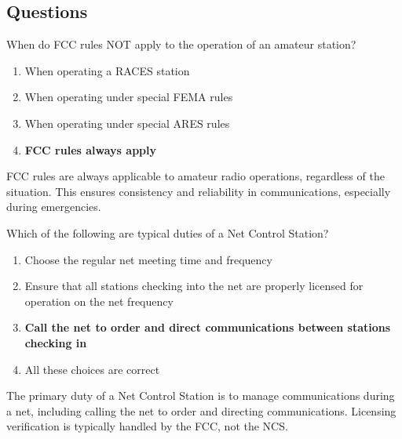 \subsection*{Questions}
\begin{tcolorbox}[colback=gray!10!white,colframe=black!75!black,title={T2C01}]
    When do FCC rules NOT apply to the operation of an amateur station?
    \begin{enumerate}[label=\Alph*),noitemsep]
        \item When operating a RACES station
        \item When operating under special FEMA rules
        \item When operating under special ARES rules
        \item \textbf{FCC rules always apply}
    \end{enumerate}
\end{tcolorbox}
FCC rules are always applicable to amateur radio operations, regardless of the situation. This ensures consistency and reliability in communications, especially during emergencies.


\begin{tcolorbox}[colback=gray!10!white,colframe=black!75!black,title={T2C02}]
    Which of the following are typical duties of a Net Control Station?
    \begin{enumerate}[label=\Alph*),noitemsep]
        \item Choose the regular net meeting time and frequency
        \item Ensure that all stations checking into the net are properly licensed for operation on the net frequency
        \item \textbf{Call the net to order and direct communications between stations checking in}
        \item All these choices are correct
    \end{enumerate}
\end{tcolorbox}
The primary duty of a Net Control Station is to manage communications during a net, including calling the net to order and directing communications. Licensing verification is typically handled by the FCC, not the NCS.


